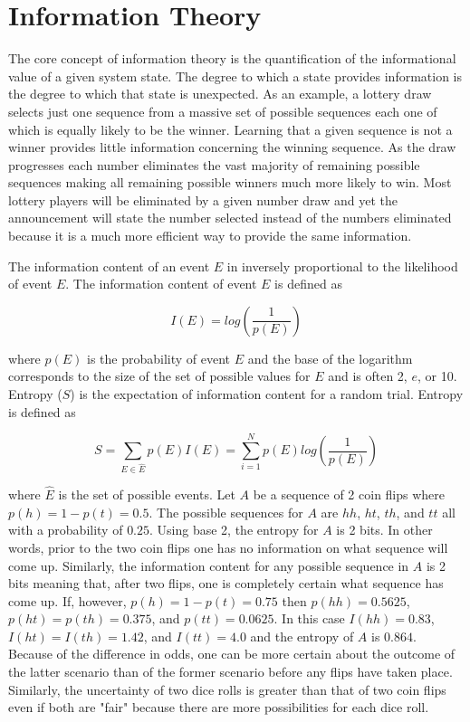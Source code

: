 \section{Information Theory}

The core concept of information theory is the quantification of the informational value of a given system state. The degree to which a state provides information is the degree to which that state is unexpected. As an example, a lottery draw selects just one sequence from a massive set of possible sequences each one of which is equally likely to be the winner. Learning that a given sequence is not a winner provides little information concerning the winning sequence. As the draw progresses each number eliminates the vast majority of remaining possible sequences making all remaining possible winners much more likely to win. Most lottery players will be eliminated by a given number draw and yet the announcement will state the number selected instead of the numbers eliminated because it is a much more efficient way to provide the same information.

The information content of an event $E$ in inversely proportional to the likelihood of event $E$. The information content of event $E$ is defined as

\begin{equation}
	I(E) = log\left(\frac{1}{p(E)}\right) \label{eq:information_content}
\end{equation}

where $p(E)$ is the probability of event $E$ and the base of the logarithm corresponds to the size of the set of possible values for $E$ and is often 2, $e$, or 10. Entropy ($S$) is the expectation of information content for a random trial. Entropy is defined as

\begin{equation}
	S = \sum_{E \in \hat{E}}p(E)I(E) = \sum_{i = 1}^{N}p(E)log\left(\frac{1}{p(E)}\right) \label{eq:entropy}
\end{equation}

where $\hat{E}$ is the set of possible events. Let $A$ be a sequence of 2 coin flips where $p(h) = 1 - p(t) = 0.5$. The possible sequences for $A$ are $hh$, $ht$, $th$, and $tt$ all with a probability of $0.25$. Using base 2, the entropy for $A$ is 2 bits. In other words, prior to the two coin flips one has no information on what sequence will come up. Similarly, the information content for any possible sequence in $A$ is 2 bits meaning that, after two flips, one is completely certain what sequence has come up. If, however, $p(h) = 1 - p(t) = 0.75$ then $p(hh) = 0.5625$, $p(ht) = p(th) = 0.375$, and $p(tt) = 0.0625$. In this case $I(hh) = 0.83$, $I(ht) = I(th) = 1.42$, and $I(tt) = 4.0$ and the entropy of $A$ is $0.864$. Because of the difference in odds, one can be more certain about the outcome of the latter scenario than of the former scenario before any flips have taken place. Similarly, the uncertainty of two dice rolls is greater than that of two coin flips even if both are "fair" because there are more possibilities for each dice roll.

